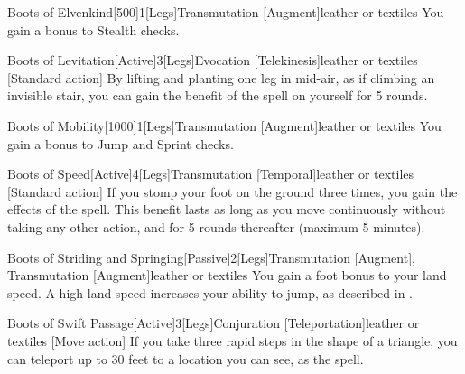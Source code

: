             \begin{magicitemdef}{Boots of Elvenkind}[500]{1}[Legs]{Transmutation [Augment]}{leather or textiles}
                 You gain a  bonus to Stealth checks.
            \end{magicitemdef}

            \begin{magicitemdef}{Boots of Levitation}[Active]{3}[Legs]{Evocation [Telekinesis]}{leather or textiles}
                [Standard action] By lifting and planting one leg in mid-air, as if climbing an invisible stair, you can gain the benefit of the  spell on yourself for 5 rounds.
            \end{magicitemdef}

            \begin{magicitemdef}{Boots of Mobility}[1000]{1}[Legs]{Transmutation [Augment]}{leather or textiles}
                 You gain a  bonus to Jump and Sprint checks.
            \end{magicitemdef}

            \begin{magicitemdef}{Boots of Speed}[Active]{4}[Legs]{Transmutation [Temporal]}{leather or textiles}
                [Standard action] If you stomp your foot on the ground three times, you gain the effects of the  spell.
                This benefit lasts as long as you move continuously without taking any other action, and for 5 rounds thereafter (maximum 5 minutes).
            \end{magicitemdef}

            \begin{magicitemdef}{Boots of Striding and Springing}[Passive]{2}[Legs]{Transmutation [Augment], Transmutation [Augment]}{leather or textiles}
                 You gain a  foot bonus to your land speed.
                A high land speed increases your ability to jump, as described in .
            \end{magicitemdef}

            \begin{magicitemdef}{Boots of Swift Passage}[Active]{3}[Legs]{Conjuration [Teleportation]}{leather or textiles}
                [Move action] If you take three rapid steps in the shape of a triangle, you can teleport up to 30 feet to a location you can see, as the  spell.
            \end{magicitemdef}

